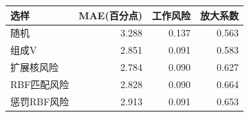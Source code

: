 \begin{tabular}{lrrr}\toprule
选样 & MAE(百分点) & 工作风险 & 放大系数 \\ \midrule
随机 & 3.288 & 0.137 & 0.563 \\
组成V & 2.851 & 0.091 & 0.583 \\
扩展核风险 & 2.784 & 0.090 & 0.627 \\
RBF匹配风险 & 2.828 & 0.090 & 0.664 \\
惩罚RBF风险 & 2.913 & 0.091 & 0.653 \\
\bottomrule\end{tabular}
